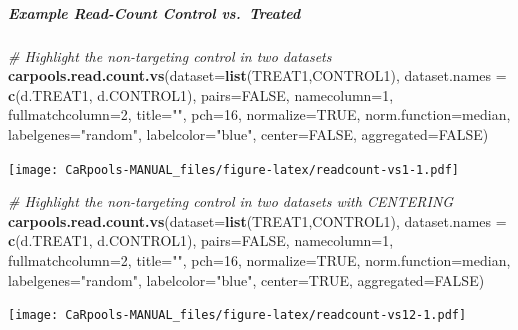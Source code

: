 \documentclass[]{article}
\newenvironment{Shaded}{\begin{snugshade}}{\end{snugshade}}
\newcommand{\KeywordTok}[1]{\textcolor[rgb]{0.13,0.29,0.53}{\textbf{{#1}}}}
\newcommand{\DataTypeTok}[1]{\textcolor[rgb]{0.13,0.29,0.53}{{#1}}}
\newcommand{\DecValTok}[1]{\textcolor[rgb]{0.00,0.00,0.81}{{#1}}}
\newcommand{\StringTok}[1]{\textcolor[rgb]{0.31,0.60,0.02}{{#1}}}
\newcommand{\CommentTok}[1]{\textcolor[rgb]{0.56,0.35,0.01}{\textit{{#1}}}}
\newcommand{\OtherTok}[1]{\textcolor[rgb]{0.56,0.35,0.01}{{#1}}}
\newcommand{\NormalTok}[1]{{#1}}
\let\oldsubparagraph\subparagraph
\renewcommand{\subparagraph}[1]{\oldsubparagraph{#1}\mbox{}}
\begin{document}
\subparagraph{Example Read-Count Control
vs.~Treated}\label{example-read-count-control-vs.treated}

\begin{Shaded}
\begin{Highlighting}[]
\CommentTok{# Highlight the non-targeting control in two datasets}
\KeywordTok{carpools.read.count.vs}\NormalTok{(}\DataTypeTok{dataset=}\KeywordTok{list}\NormalTok{(TREAT1,CONTROL1), }\DataTypeTok{dataset.names =} \KeywordTok{c}\NormalTok{(d.TREAT1, d.CONTROL1),}
  \DataTypeTok{pairs=}\OtherTok{FALSE}\NormalTok{, }\DataTypeTok{namecolumn=}\DecValTok{1}\NormalTok{, }\DataTypeTok{fullmatchcolumn=}\DecValTok{2}\NormalTok{, }\DataTypeTok{title=}\StringTok{""}\NormalTok{, }\DataTypeTok{pch=}\DecValTok{16}\NormalTok{,}
  \DataTypeTok{normalize=}\OtherTok{TRUE}\NormalTok{, }\DataTypeTok{norm.function=}\NormalTok{median, }\DataTypeTok{labelgenes=}\StringTok{"random"}\NormalTok{, }\DataTypeTok{labelcolor=}\StringTok{"blue"}\NormalTok{,}
  \DataTypeTok{center=}\OtherTok{FALSE}\NormalTok{, }\DataTypeTok{aggregated=}\OtherTok{FALSE}\NormalTok{)}
\end{Highlighting}
\end{Shaded}

\texttt{[image: CaRpools-MANUAL\_files/figure-latex/readcount-vs1-1.pdf]}

\begin{Shaded}
\begin{Highlighting}[]
\CommentTok{# Highlight the non-targeting control in two datasets with CENTERING}
\KeywordTok{carpools.read.count.vs}\NormalTok{(}\DataTypeTok{dataset=}\KeywordTok{list}\NormalTok{(TREAT1,CONTROL1), }\DataTypeTok{dataset.names =} \KeywordTok{c}\NormalTok{(d.TREAT1, d.CONTROL1),}
  \DataTypeTok{pairs=}\OtherTok{FALSE}\NormalTok{, }\DataTypeTok{namecolumn=}\DecValTok{1}\NormalTok{, }\DataTypeTok{fullmatchcolumn=}\DecValTok{2}\NormalTok{, }\DataTypeTok{title=}\StringTok{""}\NormalTok{, }\DataTypeTok{pch=}\DecValTok{16}\NormalTok{,}
  \DataTypeTok{normalize=}\OtherTok{TRUE}\NormalTok{, }\DataTypeTok{norm.function=}\NormalTok{median, }\DataTypeTok{labelgenes=}\StringTok{"random"}\NormalTok{, }\DataTypeTok{labelcolor=}\StringTok{"blue"}\NormalTok{,}
  \DataTypeTok{center=}\OtherTok{TRUE}\NormalTok{, }\DataTypeTok{aggregated=}\OtherTok{FALSE}\NormalTok{)}
\end{Highlighting}
\end{Shaded}

\texttt{[image: CaRpools-MANUAL\_files/figure-latex/readcount-vs12-1.pdf]}
\end{document}
